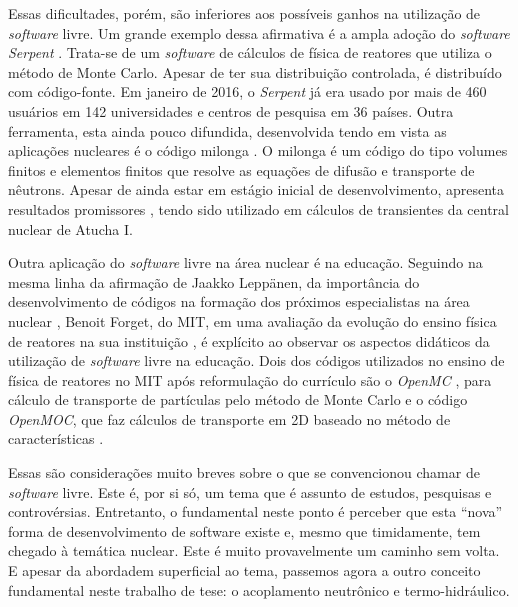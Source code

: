 Essas dificultades, porém, são inferiores aos possíveis ganhos na utilização de
\textit{software} livre. Um grande exemplo dessa afirmativa é a ampla adoção
do \textit{software Serpent} \cite{Serpent2013}. Trata-se de um \textit{software}
de cálculos de física de reatores que utiliza o método de Monte Carlo. Apesar
de ter sua distribuição controlada, é distribuído com código-fonte. Em janeiro
de 2016, o \textit{Serpent} já era usado por mais de 460 usuários em 142 universidades
e centros de pesquisa em 36 países. Outra ferramenta, esta ainda pouco difundida,
desenvolvida tendo em vista as aplicações nucleares é o código milonga \cite{Theler2015}.
O milonga é um código do tipo volumes finitos e elementos finitos que resolve as equações
de difusão e transporte de nêutrons. Apesar de ainda estar em estágio inicial de
desenvolvimento, apresenta resultados promissores \cite{Theler2014b}, tendo sido
utilizado em cálculos de transientes da central nuclear de Atucha I.

Outra aplicação do \textit{software} livre na área nuclear é na educação. Seguindo na
mesma linha da afirmação de Jaakko Leppänen, da importância do desenvolvimento de
códigos na formação dos próximos especialistas na área nuclear \cite{Leppanen2015}, Benoit
Forget, do MIT, em uma avaliação da evolução do ensino física de reatores na sua instituição \cite{Forget2014}, é explícito ao observar os aspectos didáticos da
utilização de \textit{software} livre na educação. Dois dos códigos utilizados
no ensino de física de reatores no MIT após reformulação do currículo são o \textit{OpenMC}
\cite{Romano2013}, para cálculo de transporte de partículas pelo método de Monte Carlo e
o código \textit{OpenMOC}, que faz cálculos de transporte em 2D baseado
no método de características \cite{Boyd2014}.

Essas são considerações muito breves sobre o que se convencionou chamar
de \textit{software} livre. Este é, por si só, um tema que é assunto de estudos, pesquisas
e controvérsias. Entretanto, o fundamental neste ponto é perceber que esta ``nova'' forma
de desenvolvimento de software existe e, mesmo que timidamente, tem chegado à temática
nuclear. Este é muito provavelmente um caminho sem volta. E apesar da abordadem
superficial ao tema, passemos agora a outro conceito fundamental neste trabalho
de tese: o acoplamento neutrônico e termo-hidráulico.

